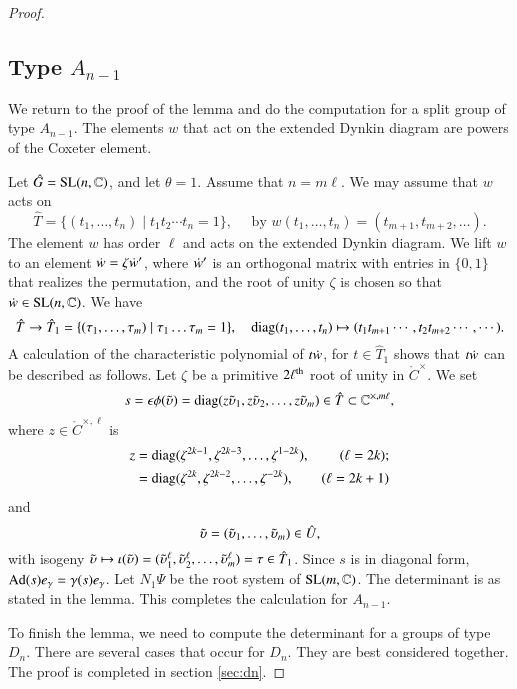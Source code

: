 \begin{proof}
\subsection{Type $A_{n-1}$}
We return to the proof of the lemma and do the computation for a split
group of type $A_{n-1}$.  The elements $w$ that act on the extended
Dynkin diagram are powers of the Coxeter element.

Let $\hat G = {\operatorname{SL}}(n,\mathbb{C})$, and let $\theta=1$.  Assume that
$n=m \ell$.  We may assume that $w$ acts on
\[
\hat T = \{(t_1,\ldots,t_{n})\mid t_1t_2\cdots t_{n}=1\},\quad \text{ by } w(t_1,\ldots,t_{n}) = (t_{m+1},t_{m+2},\ldots).
\]
The element $w$ has order $\ell$ and acts on the extended Dynkin
diagram.  We lift $w$ to an element $\dot w = \zeta \dot w'$, where
$\dot w'$ is an orthogonal matrix with entries in $\{0,1\}$ that
realizes the permutation, and the root of unity $\zeta$ is chosen so
that $\dot w \in {\operatorname{SL}}(n,\mathbb{C})$.  We have
\[
\hat T \to \hat T_1 = \{(\tau_1,\ldots,\tau_m)\mid \tau_1\ldots\tau_m=1\},\quad {\operatorname{diag}}(t_1,\ldots,t_n)\mapsto (t_1t_{m+1}\cdots,t_2 t_{m+2}\cdots,\cdots).
\]
A calculation of the characteristic polynomial of $t\dot w$, for $t\in
\hat T_1$ shows that $t\dot w$ can be described as follows.  Let
$\zeta$ be a primitive $2\ell^{\operatorname{th}}$ root of unity in
$\ring{C}^\times$.  We set
\begin{equation}
s=\epsilon\phi(\tilde\upsilon)={\operatorname{diag}}(z\tilde\upsilon_1,z\tilde\upsilon_2,\ldots,z\tilde\upsilon_m)\in \hat T\subset \mathbb{C}^{\times,m\ell},
\end{equation}
where $z\in \ring{C}^{\times,\ell}$ is
\begin{align*}
z &= {\operatorname{diag}}(\zeta^{2k-1},\zeta^{2k-3},\ldots,\zeta^{1-2k}), &(\ell=2k);\\
      &= {\operatorname{diag}}(\zeta^{2k},\zeta^{2k-2},\ldots,\zeta^{-2k}), &(\ell=2k+1)
\end{align*}
and
\[
\tilde\upsilon=(\tilde\upsilon_1,\ldots,\tilde\upsilon_m)\in \hat U,
\]
with isogeny $\tilde\upsilon\mapsto
\iota(\tilde\upsilon)=(\tilde\upsilon_1^\ell,\tilde\upsilon_2^\ell,\ldots,\tilde\upsilon_m^\ell) = \tau\in \hat
T_1$.  Since $s$ is in diagonal form, ${\operatorname{Ad}}(s) e_\gamma = \gamma(s)
e_\gamma$.  Let $N_1\Psi$ be the root system of ${\operatorname{SL}}(m,\mathbb{C})$.
The determinant is as stated in the lemma.  This completes the
calculation for $A_{n-1}$.

To finish the lemma, we need to compute the determinant for a groups
of type $D_n$.  There are several cases that occur for $D_n$.  They
are best considered together.  The proof is completed in section
\ref{sec:dn}.
\end{proof}


